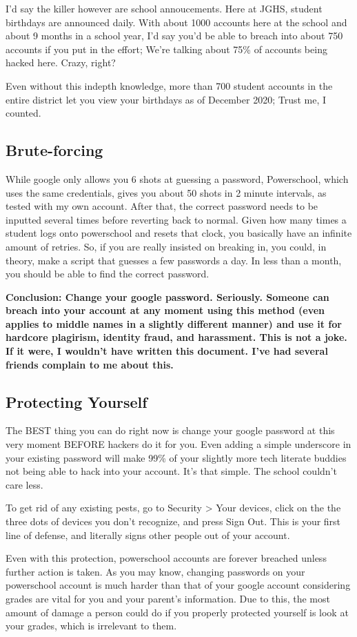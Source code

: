 I'd say the killer however are school annoucements. Here at JGHS, student birthdays are announced daily. With about 1000 accounts here at the school and about 9 months in a school year, I'd say you'd be able to breach into about 750 accounts if you put in the effort; We're talking about 75\% of accounts being hacked here. Crazy, right?

Even without this indepth knowledge, more than 700 student accounts in the entire district let you view your birthdays as of December 2020; Trust me, I counted.

\subsection{Brute-forcing}

While google only allows you 6 shots at guessing a password, Powerschool, which uses the same credentials, gives you about 50 shots in 2 minute intervals, as tested with my own account. After that, the correct password needs to be inputted several times before reverting back to normal. Given how many times a student logs onto powerschool and resets that clock, you basically have an infinite amount of retries. So, if you are really insisted on breaking in, you could, in theory, make a script that guesses a few passwords a day. In less than a month, you should be able to find the correct password.

\textbf{Conclusion: Change your google password. Seriously. Someone can breach into your account at any moment using this method (even applies to middle names in a slightly different manner) and use it for hardcore plagirism, identity fraud, and harassment. This is not a joke. If it were, I wouldn't have written this document. I've had several friends complain to me about this.}

\subsection{Protecting Yourself}

The BEST thing you can do right now is change your google password at this very moment BEFORE hackers do it for you. Even adding a simple underscore in your existing password will make 99\% of your slightly more tech literate buddies not being able to hack into your account. It's that simple. The school couldn't care less.

To get rid of any existing pests, go to Security > Your devices, click on the the three dots of devices you don't recognize, and press Sign Out. This is your first line of defense, and literally signs other people out of your account.

Even with this protection, powerschool accounts are forever breached unless further action is taken. As you may know, changing passwords on your powerschool account is much harder than that of your google account considering grades are vital for you and your parent's information. Due to this, the most amount of damage a person could do if you properly protected yourself is look at your grades, which is irrelevant to them.
